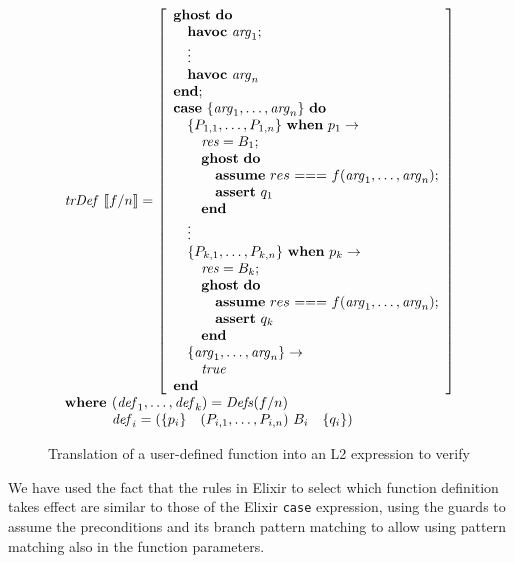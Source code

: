 \begin{figure}
\[
\begin{array}{l}
\trDef{f/n} = \left[ \begin{array}{l}
\ghostE~\doW\\
\quad\havocE~\mathit{arg}_1;\\
\quad\vdots\\
\quad\havocE~\mathit{arg}_n\\
\Wend;\\
\caseE~\{\mathit{arg}_1,\dots,\mathit{arg}_n\}~\doW \\
\quad \{P_{1,1},\dots,P_{1,n}\}~\whenE~p_1 \rightarrow\\ 
\quad\quad \mathit{res} = B_1; \\
\quad\quad \ghostE~\doW\\ 
\quad\quad\quad\assumeE~res~\mathit{===}~f(\mathit{arg}_1,\dots,\mathit{arg}_n);\\
\quad\quad\quad\assertE~q_1\\
\quad\quad \Wend\\
\quad\vdots\\
\quad \{P_{k,1},\dots,P_{k,n}\}~\whenE~p_k \rightarrow\\ 
\quad\quad \mathit{res} = B_k; \\
\quad\quad \ghostE~\doW\\ 
\quad\quad\quad\assumeE~res~\mathit{===}~f(\mathit{arg}_1,\dots,\mathit{arg}_n);\\
\quad\quad\quad\assertE~q_k\\
\quad\quad \Wend\\
\quad \{\mathit{arg}_1,\dots,\mathit{arg}_n\} \rightarrow\\
\quad\quad\true\\ 
\Wend
\end{array}
\right]\\
\textbf{where } (\mathit{def}_1, \dots, \mathit{def}_k) = \Defs{f/n}\\
\phantom{\textbf{where }} \mathit{def}_i = \left(\{ p_i \}  \quad (P_{i,1}, \dots, P_{i,n})~B_i \quad \{ q_i \} \right) 
\end{array}
\]
\caption{Translation of a user-defined function into an L2 expression to verify}
\label{fig:deftr}
\end{figure}

We have used the fact that the rules in Elixir to select which function
definition takes effect are similar to those of the Elixir \verb|case|
expression, using the guards to assume the preconditions and its branch pattern
matching to allow using pattern matching also in the function parameters.

